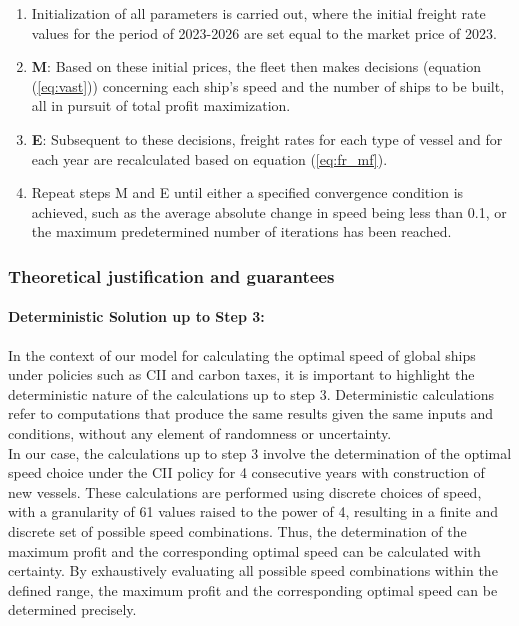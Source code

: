 \documentclass[a4paper,12pt]{article}
\begin{document}
\begin{enumerate}
	\item Initialization of all parameters is carried out, where the initial freight rate values for the period of 2023-2026 are set equal to the market price of 2023.
	\item \textbf{M}: Based on these initial prices, the fleet then makes decisions (equation (\ref{eq:vast})) concerning each ship's speed and the number of ships to be built, all in pursuit of total profit maximization.
	\item \textbf{E}: Subsequent to these decisions, freight rates for each type of vessel and for each year are recalculated based on equation (\ref{eq:fr_mf}).
	\item Repeat steps M and E until either a specified convergence condition is achieved, such as the average absolute change in speed being less than 0.1, or the maximum predetermined number of iterations has been reached.\\
\end{enumerate}


\subsubsection{Theoretical justification and guarantees}

\paragraph{Deterministic Solution up to Step 3:}

In the context of our model for calculating the optimal speed of global ships under policies such as CII and carbon taxes, it is important to highlight the deterministic nature of the calculations up to step 3.
Deterministic calculations refer to computations that produce the same results given the same inputs and conditions, without any element of randomness or uncertainty.\\

In our case, the calculations up to step 3 involve the determination of the optimal speed choice under the CII policy for 4 consecutive years with construction of new vessels.
These calculations are performed using discrete choices of speed, with a granularity of 61 values raised to the power of 4, resulting in a finite and discrete set of possible speed combinations.
Thus, the determination of the maximum profit and the corresponding optimal speed can be calculated with certainty.
By exhaustively evaluating all possible speed combinations within the defined range, the maximum profit and the corresponding optimal speed can be determined precisely.\\
\end{document}
